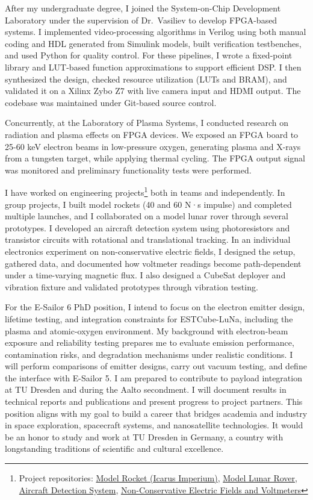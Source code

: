 \documentclass[a4paper,12pt]{article}
\begin{document}
After my undergraduate degree, I joined the System-on-Chip Development Laboratory under the supervision of Dr.\ Vasiliev to develop FPGA-based systems. I implemented video-processing algorithms in Verilog using both manual coding and HDL generated from Simulink models, built verification testbenches, and used Python for quality control. For these pipelines, I wrote a fixed-point library and LUT-based function approximations to support efficient DSP. I then synthesized the design, checked resource utilization (LUTs and BRAM), and validated it on a Xilinx Zybo Z7 with live camera input and HDMI output. The codebase was maintained under Git-based source control.

Concurrently, at the Laboratory of Plasma Systems, I conducted research on radiation and plasma effects on FPGA devices. We exposed an FPGA board to 25-60 keV electron beams in low-pressure oxygen, generating plasma and X-rays from a tungsten target, while applying thermal cycling. The FPGA output signal was monitored and preliminary functionality tests were performed.

I have worked on engineering projects\footnote{Project repositories: \href{https://github.com/icarus-imperium/rocket-2025}{Model Rocket (Icarus Imperium)}, \href{https://github.com/rezaaliasgarirenani/Rover}{Model Lunar Rover}, \href{https://github.com/rezaaliasgarirenani/Aircraft-Detection-System}{Aircraft Detection System}, \href{https://github.com/rezaaliasgarirenani/Non-Conservative-Electric-Fields-and-Voltmeters}{Non-Conservative Electric Fields and Voltmeters}} both in teams and independently. In group projects, I built model rockets (40 and 60 N·s impulse) and completed multiple launches, and I collaborated on a model lunar rover through several prototypes. I developed an aircraft detection system using photoresistors and transistor circuits with rotational and translational tracking. In an individual electronics experiment on non-conservative electric fields, I designed the setup, gathered data, and documented how voltmeter readings become path-dependent under a time-varying magnetic flux. I also designed a CubeSat deployer and vibration fixture and validated prototypes through vibration testing.

For the E-Sailor 6 PhD position, I intend to focus on the electron emitter design, lifetime testing, and integration constraints for ESTCube-LuNa, including the plasma and atomic-oxygen environment. My background with electron-beam exposure and reliability testing prepares me to evaluate emission performance, contamination risks, and degradation mechanisms under realistic conditions. I will perform comparisons of emitter designs, carry out vacuum testing, and define the interface with E-Sailor 5. I am prepared to contribute to payload integration at TU Dresden and during the Aalto secondment. I will document results in technical reports and publications and present progress to project partners. This position aligns with my goal to build a career that bridges academia and industry in space exploration, spacecraft systems, and nanosatellite technologies. It would be an honor to study and work at TU Dresden in Germany, a country with longstanding traditions of scientific and cultural excellence.
\end{document}
